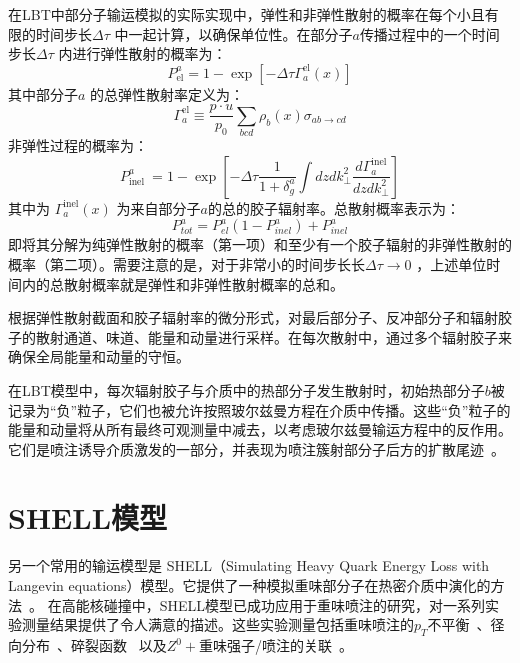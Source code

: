 	在LBT中部分子输运模拟的实际实现中，弹性和非弹性散射的概率在每个小且有限的时间步长$\Delta \tau$ 中一起计算，以确保单位性。在部分子$a$传播过程中的一个时间步长$\Delta \tau$  内进行弹性散射的概率为：
\begin{equation}
		P_{\mathrm{el}}^a=1- \exp \left[-\Delta \tau \Gamma_a^{\mathrm{el}}(x)\right]
\end{equation}
	其中部分子$a$ 的总弹性散射率定义为：
\begin{equation}
		\Gamma_a^{\mathrm{el}} \equiv \frac{p \cdot u}{p_0} \sum_{b c d} \rho_b(x) \sigma_{a b \rightarrow c d}
\end{equation}
	非弹性过程的概率为：
\begin{equation}
	P_{\text {inel }}^a=1-\exp \left[-\Delta \tau \frac{1}{1+\delta_g^a} \int d z d k_{\perp}^2 \frac{d \Gamma_a^{\mathrm{inel}}}{d z d k_{\perp}^2}\right] 
\end{equation}
	其中为 $\Gamma_a^{\mathrm{inel}}(x)$ 为来自部分子$a$的总的胶子辐射率。总散射概率表示为：
\begin{equation}
	P_{tot}^a = P_{el}^a  (1- P_{inel}^a ) + P_{inel}^a 
\end{equation}
	即将其分解为纯弹性散射的概率（第一项）和至少有一个胶子辐射的非弹性散射的概率（第二项）。需要注意的是，对于非常小的时间步长长$\Delta \tau \rightarrow 0$ ，上述单位时间内的总散射概率就是弹性和非弹性散射概率的总和。

	根据弹性散射截面和胶子辐射率的微分形式，对最后部分子、反冲部分子和辐射胶子的散射通道、味道、能量和动量进行采样。在每次散射中，通过多个辐射胶子来确保全局能量和动量的守恒。

	在LBT模型中，每次辐射胶子与介质中的热部分子发生散射时，初始热部分子$b$被记录为“负”粒子，它们也被允许按照玻尔兹曼方程在介质中传播。这些“负”粒子的能量和动量将从所有最终可观测量中减去，以考虑玻尔兹曼输运方程中的反作用。它们是喷注诱导介质激发的一部分，并表现为喷注簇射部分子后方的扩散尾迹~\parencite{Wang:2013cia,Li:2010ts,Peng:2014jia}。
	
\section{SHELL模型}
\label{sec:shell}

  另一个常用的输运模型是 SHELL（Simulating Heavy Quark Energy Loss with Langevin equations）模型。它提供了一种模拟重味部分子在热密介质中演化的方法~\parencite{Svetitsky:1987gq,Cao:2013ita,Dai:2018mhw,Wang:2019xey,Wang:2020ukj,Wang:2020bqz,Wang:2021jgm,Li:2022tcr}。
  在高能核碰撞中，SHELL模型已成功应用于重味喷注的研究，对一系列实验测量结果提供了令人满意的描述。这些实验测量包括重味喷注的$p_T$不平衡~\parencite{Dai:2018mhw}、径向分布~\parencite{Wang:2019xey,Wang:2020ukj,Wang:2020bqz}、碎裂函数~\parencite{Li:2022tcr} 以及$Z^0+$重味强子/喷注的关联~\parencite{Wang:2020qwe,Wang:2021jgm}。
  
